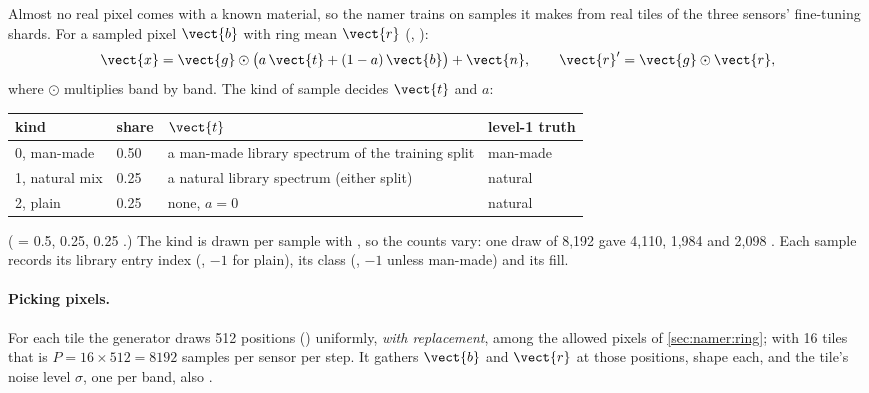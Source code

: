 Almost no real pixel comes with a known material, so the namer trains on samples it makes from real tiles of the
three sensors' fine-tuning shards. For a sampled pixel $\vect{b}$ with ring mean $\vect{r}$ (,
):
\begin{equation}
\vect{x}=\vect{g}\odot\big(a\,\vect{t}+(1-a)\,\vect{b}\big)+\vect{n},\qquad \vect{r}'=\vect{g}\odot\vect{r},
\label{eq:namer:plant}
\end{equation}
where $\odot$ multiplies band by band. The kind of sample decides $\vect{t}$ and $a$:
\begin{center}\small
\begin{tabular}{llll}
\toprule
kind & share & $\vect{t}$ & level-1 truth\\
\midrule
0, man-made & 0.50 & a man-made library spectrum of the training split & man-made\\
1, natural mix & 0.25 & a natural library spectrum (either split) & natural\\
2, plain & 0.25 & none, $a=0$ & natural\\
\bottomrule
\end{tabular}
\end{center}
( = 0.5, 0.25, 0.25 .) The kind is drawn per sample with
, so the counts vary: one draw of 8,192 gave 4,110, 1,984 and 2,098 \tagC. Each sample records
its library entry index (, $-1$ for plain), its class (, $-1$ unless man-made) and its fill.

\paragraph{Picking pixels.} For each tile the generator draws 512 positions () uniformly,
\emph{with replacement}, among the allowed pixels of \cref{sec:namer:ring}; with 16 tiles that is $P=16\times512=8192$
samples per sensor per step. It gathers $\vect{b}$ and $\vect{r}$ at those positions, shape  each,
and the tile's noise level $\sigma$, one per band, also .

